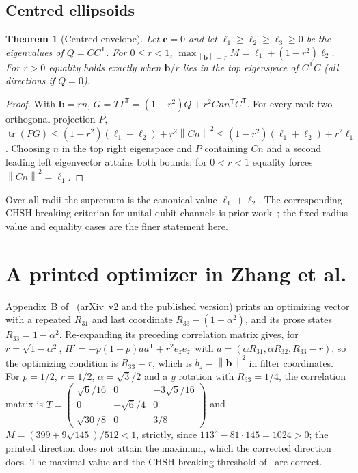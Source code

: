 \documentclass[11pt]{article}
\newtheorem{theorem}{Theorem}[section]
\theoremstyle{remark}\newtheorem{remark}[theorem]{Remark}
\DeclareMathOperator{\tr}{tr}\DeclareMathOperator{\diag}{diag}
\newcommand{\norm}[1]{\left\lVert#1\right\rVert}
\newcommand{\cv}{\bm c}\newcommand{\av}{\bm a}\newcommand{\bv}{\bm b}
\begin{document}
\subsection{Centred ellipsoids}
\begin{theorem}[Centred envelope]\label{thm:centred}
Let $\cv=0$ and let $\ell_1\ge\ell_2\ge\ell_3\ge0$ be the eigenvalues of
$Q=CC^{\mathsf T}$. For $0\le r<1$, $\max_{\norm{\bv}=r}M=\ell_1+(1-r^2)\ell_2$.
For $r>0$ equality holds exactly when $\bv/r$ lies in the top eigenspace of
$C^{\mathsf T}C$ (all directions if $Q=0$).
\end{theorem}
\begin{proof}
With $\bv=rn$, $G=TT^{\mathsf T}=(1-r^2)Q+r^2Cnn^{\mathsf T}C^{\mathsf T}$. For
every rank-two orthogonal projection $P$,
$\tr(PG)\le(1-r^2)(\ell_1+\ell_2)+r^2\norm{Cn}^2\le(1-r^2)(\ell_1+\ell_2)+r^2\ell_1$.
Choosing $n$ in the top right eigenspace and $P$ containing $Cn$ and a second
leading left eigenvector attains both bounds; for $0<r<1$ equality forces
$\norm{Cn}^2=\ell_1$.
\end{proof}
Over all radii the supremum is the canonical value $\ell_1+\ell_2$. The
corresponding CHSH-breaking criterion for unital qubit channels is prior
work~\cite{pal,zhang}; the fixed-radius value and equality cases are the
finer statement here.

\section{A printed optimizer in Zhang et al.}\label{sec:zhang}
Appendix~B of~\cite{zhang} (arXiv~v2 and the published version) prints an
optimizing vector with a repeated $R_{31}$ and last coordinate
$R_{33}-(1-\alpha^2)$, and its prose states $R_{33}=1-\alpha^2$. Re-expanding
its preceding correlation matrix gives, for $r=\sqrt{1-\alpha^2}$,
$H'=-p(1-p)aa^{\mathsf T}+r^2e_ze_z^{\mathsf T}$ with
$a=(\alpha R_{31},\alpha R_{32},R_{33}-r)$, so the optimizing condition is
$R_{33}=r$, which is $b_z=\norm{\bv}^2$ in filter coordinates. For $p=1/2$,
$r=1/2$, $\alpha=\sqrt3/2$ and a $y$ rotation with $R_{33}=1/4$, the correlation
matrix is
$T=\left(\begin{smallmatrix}\sqrt6/16&0&-3\sqrt5/16\\0&-\sqrt6/4&0\\\sqrt{30}/8&0&3/8\end{smallmatrix}\right)$
and $M=(399+9\sqrt{145})/512<1$, strictly, since $113^2-81\cdot145=1024>0$;
the printed direction does not attain the maximum, which the corrected
direction does. The maximal value and the CHSH-breaking threshold
of~\cite{zhang} are correct.
\end{document}
